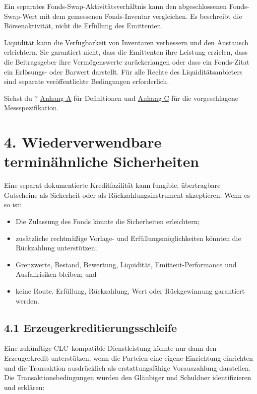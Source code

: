 \documentclass[11pt]{article}
\begin{document}
Ein separates Fonds-Swap-Aktivitätsverhältnis kann den abgeschlossenen Fonds-Swap-Wert mit dem gemessenen Fonds-Inventar vergleichen. Es beschreibt die Börsenaktivität, nicht die Erfüllung des Emittenten.

Liquidität kann die Verfügbarkeit von Inventaren verbessern und den Austausch erleichtern. Sie garantiert nicht, dass die Emittenten ihre Leistung erzielen, dass die Beitragsgeber ihre Vermögenswerte zurückerlangen oder dass ein Fonds-Zitat ein Erlösungs- oder Barwert darstellt. Für alle Rechte des Liquiditätsanbieters sind separate veröffentlichte Bedingungen erforderlich.

Siehst du ? \href{https://docs.cosmolocal.credit/de/white-paper/appendix-a-math-box}{Anhang A} für Definitionen und \href{https://docs.cosmolocal.credit/de/white-paper/appendix-c-kpi-definitions}{Anhang C} für die vorgeschlagene Messspezifikation.


\section*{4. Wiederverwendbare terminähnliche Sicherheiten}

Eine separat dokumentierte Kreditfazilität kann fungible, übertragbare Gutscheine als Sicherheit oder als Rückzahlungsinstrument akzeptieren. Wenn es so ist:

\begin{itemize}[leftmargin=*]
\item Die Zulassung des Fonds könnte die Sicherheiten erleichtern;
\item zusätzliche rechtmäßige Vorlage- und Erfüllungsmöglichkeiten könnten die Rückzahlung unterstützen;
\item Grenzwerte, Bestand, Bewertung, Liquidität, Emittent-Performance und Ausfallrisiken bleiben; und
\item keine Route, Erfüllung, Rückzahlung, Wert oder Rückgewinnung garantiert werden.
\end{itemize}
\subsection*{4.1 Erzeugerkreditierungsschleife}

Eine zukünftige CLC--kompatible Dienstleistung könnte nur dann den Erzeugerkredit unterstützen, wenn die Parteien eine eigene Einrichtung einrichten und die Transaktion ausdrücklich als erstattungsfähige Vorauszahlung darstellen. Die Transaktionsbedingungen würden den Gläubiger und Schuldner identifizieren und erklären:
\end{document}
